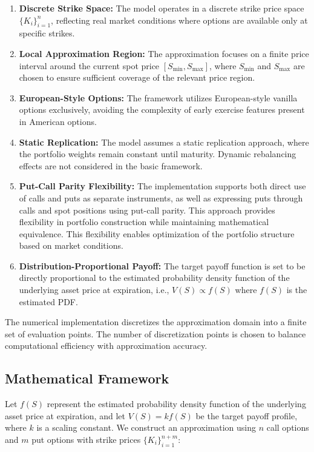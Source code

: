\documentclass[12pt]{article}
\begin{document}
\begin{enumerate}
    \item \textbf{Discrete Strike Space:} The model operates in a discrete strike price space 
    $\{K_i\}_{i=1}^n$, reflecting real market conditions where options are available only 
    at specific strikes.
    
    \item \textbf{Local Approximation Region:} The approximation focuses on a finite price 
    interval around the current spot price $[S_{\min}, S_{\max}]$, where $S_{\min}$ and $S_{\max}$ 
    are chosen to ensure sufficient coverage of the relevant price region.
    
    \item \textbf{European-Style Options:} The framework utilizes European-style vanilla 
    options exclusively, avoiding the complexity of early exercise features present in 
    American options.
    
    \item \textbf{Static Replication:} The model assumes a static replication approach, 
    where the portfolio weights remain constant until maturity. Dynamic rebalancing effects 
    are not considered in the basic framework.
    
    \item \textbf{Put-Call Parity Flexibility:} The implementation supports both direct 
    use of calls and puts as separate instruments, as well as expressing puts through 
    calls and spot positions using put-call parity. This approach provides flexibility 
    in portfolio construction while maintaining mathematical equivalence.
    This flexibility enables optimization of the portfolio structure based on market 
    conditions.
    
    \item \textbf{Distribution-Proportional Payoff:} The target payoff function is set to be
    directly proportional to the estimated probability density function of the underlying
    asset price at expiration, i.e., $V(S) \propto f(S)$ where $f(S)$ is the estimated PDF.
\end{enumerate}

The numerical implementation discretizes the approximation domain into a finite set of 
evaluation points. The number of discretization points is chosen to balance computational 
efficiency with approximation accuracy.

\subsection{Mathematical Framework}
Let \( f(S) \) represent the estimated probability density function of the underlying asset
price at expiration, and let \( V(S) = k f(S) \) be the target payoff profile, where \( k \)
is a scaling constant. We construct an approximation using \( n \) call options and \( m \) 
put options with strike prices \( \{K_i\}_{i=1}^{n+m} \):
\end{document}
